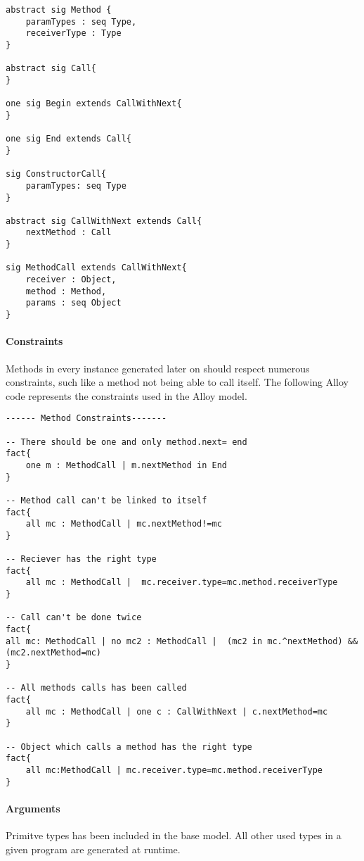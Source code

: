 \begin{lstlisting}
abstract sig Method {
    paramTypes : seq Type,
    receiverType : Type
}

abstract sig Call{
}

one sig Begin extends CallWithNext{
}

one sig End extends Call{
}

sig ConstructorCall{
    paramTypes: seq Type
}

abstract sig CallWithNext extends Call{
    nextMethod : Call
}

sig MethodCall extends CallWithNext{
    receiver : Object,
    method : Method,
    params : seq Object
}
\end{lstlisting}

\paragraph{Constraints}
Methods in every instance generated later on should respect numerous constraints, such like a method not being able to call itself. The following Alloy code represents the constraints used in the Alloy model.\\

\begin{lstlisting}
------ Method Constraints-------

-- There should be one and only method.next= end
fact{
    one m : MethodCall | m.nextMethod in End
}

-- Method call can't be linked to itself
fact{
    all mc : MethodCall | mc.nextMethod!=mc
}

-- Reciever has the right type
fact{
    all mc : MethodCall |  mc.receiver.type=mc.method.receiverType
}

-- Call can't be done twice
fact{
all mc: MethodCall | no mc2 : MethodCall |  (mc2 in mc.^nextMethod) && (mc2.nextMethod=mc)
}

-- All methods calls has been called
fact{
    all mc : MethodCall | one c : CallWithNext | c.nextMethod=mc
}

-- Object which calls a method has the right type
fact{
    all mc:MethodCall | mc.receiver.type=mc.method.receiverType
}
\end{lstlisting}

\paragraph{Arguments} Primitve types has been included in the base model. All other used types in a given program are generated at runtime.\\

